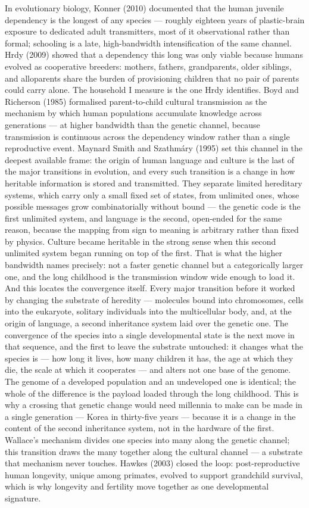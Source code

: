 \documentclass[12pt,letterpaper]{article}
\begin{document}
In evolutionary biology, Konner (2010) documented that the human
juvenile dependency is the longest of any species --- roughly
eighteen years of plastic-brain exposure to dedicated adult
transmitters, most of it observational rather than formal; schooling
is a late, high-bandwidth intensification of the same channel. Hrdy
(2009) showed that a dependency this long was only viable because
humans evolved as cooperative breeders: mothers, fathers,
grandparents, older siblings, and alloparents share the burden of
provisioning children that no pair of parents could carry alone. The
household I measure is the one Hrdy identifies. Boyd and
Richerson (1985) formalised parent-to-child cultural transmission as
the mechanism by which human populations accumulate knowledge across
generations --- at higher bandwidth than the genetic channel, because
transmission is continuous across the dependency window rather than
a single reproductive event. Maynard Smith and Szathmáry (1995)
set this channel in the deepest available frame: the origin of human
language and culture is the last of the major transitions in
evolution, and every such transition is a change in how heritable
information is stored and transmitted. They separate limited
hereditary systems, which carry only a small fixed set of states,
from unlimited ones, whose possible messages grow combinatorially
without bound --- the genetic code is the first unlimited system, and
language is the second, open-ended for the same reason, because the
mapping from sign to meaning is arbitrary rather than fixed by
physics. Culture became heritable in the strong sense when this
second unlimited system began running on top of the first. That is
what the higher bandwidth names precisely: not a faster genetic
channel but a categorically larger one, and the long childhood is the
transmission window wide enough to load it. And this locates the
convergence itself. Every major transition before it worked by changing
the substrate of heredity --- molecules bound into chromosomes, cells
into the eukaryote, solitary individuals into the multicellular body,
and, at the origin of language, a second inheritance system laid over
the genetic one. The convergence of the species into a single
developmental state is the next move in that sequence, and the first to
leave the substrate untouched: it changes what the species is --- how
long it lives, how many children it has, the age at which they die, the
scale at which it cooperates --- and alters not one base of the genome.
The genome of a developed population and an undeveloped one is
identical; the whole of the difference is the payload loaded through the
long childhood. This is why a crossing that genetic change would need
millennia to make can be made in a single generation --- Korea in
thirty-five years --- because it is a change in the content of the
second inheritance system, not in the hardware of the first. Wallace's
mechanism divides one species into many along the genetic channel; this
transition draws the many together along the cultural channel --- a
substrate that mechanism never touches. Hawkes (2003) closed the loop:
post-reproductive human longevity, unique among primates, evolved to
support grandchild survival, which is why longevity and fertility
move together as one developmental signature.
\end{document}
